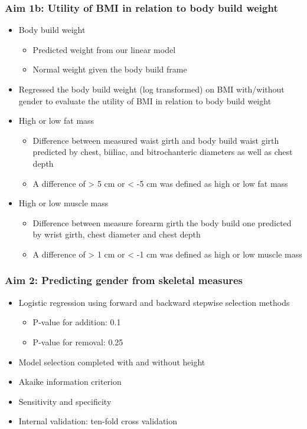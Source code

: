 \documentclass{beamer}
\begin{document}
\begin{frame}
\frametitle{Aim 1b: Utility of BMI in relation to body build weight}

\begin{itemize}
	\item Body build weight
	 	\begin{itemize}
	 		\item Predicted weight from our linear model
	 		\item Normal weight given the body build frame
	 	\end{itemize}	
	\item Regressed the body build weight (log transformed) on BMI with/without gender to evaluate the utility of BMI in relation to body build weight
	\item High or low fat mass
		\begin{itemize}
			\item Difference between measured waist girth and body build waist girth predicted by chest, biiliac, and bitrochanteric diameters as well as chest depth
			\item A difference of > 5 cm or < -5 cm was defined as high or low fat mass
		\end{itemize}	
	\item High or low muscle mass
		\begin{itemize}
			\item Difference between measure forearm girth the body build one predicted by wrist girth, chest diameter and chest depth
			\item A difference of > 1 cm or < -1 cm was defined as high or low muscle mass
		\end{itemize}	
\end{itemize}

\end{frame}

\begin{frame}
\frametitle{Aim 2: Predicting gender from skeletal measures}

\begin{itemize}
	\item Logistic regression using forward and backward stepwise selection methods
	\begin{itemize}
		\item P-value for addition: 0.1
		\item P-value for removal: 0.25
	\end{itemize}
	\item Model selection completed with and without height
	\item Akaike information criterion
	\item Sensitivity and specificity
	\item Internal validation: ten-fold cross validation
	
\end{itemize}

\end{frame}
\end{document}

